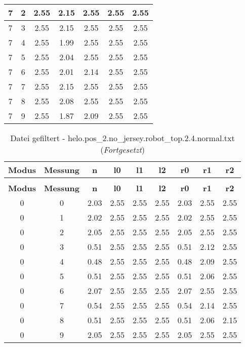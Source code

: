 \begin{longtable}{|c|c||c||c|c||c|c|}
	7 & 2 & 2.55 & 2.15 & 2.55 & 2.55 & 2.55 \\ \hline
	7 & 3 & 2.55 & 2.15 & 2.55 & 2.55 & 2.55 \\ \hline
	7 & 4 & 2.55 & 1.99 & 2.55 & 2.55 & 2.55 \\ \hline
	7 & 5 & 2.55 & 2.04 & 2.55 & 2.55 & 2.55 \\ \hline
	7 & 6 & 2.55 & 2.01 & 2.14 & 2.55 & 2.55 \\ \hline
	7 & 7 & 2.55 & 2.15 & 2.55 & 2.55 & 2.55 \\ \hline
	7 & 8 & 2.55 & 2.08 & 2.55 & 2.55 & 2.55 \\ \hline
	7 & 9 & 2.55 & 1.87 & 2.09 & 2.55 & 2.55 \\ \hline
\end{longtable}
\clearpage{}
\begin{longtable}{|c|c||c||c|c|c||c|c|c|}
	\caption{Datei gefiltert - helo.pos\_2.no\_jersey.robot\_top.2.4.normal.txt} \label{tab:helo.pos-2.no-jersey.robot-top.2.4.normal.txt} \\ \hline
	\textbf{Modus} & \textbf{Messung} & \textbf{n} & \textbf{l0} & \textbf{l1} & \textbf{l2} & \textbf{r0} & \textbf{r1} & \textbf{r2}\\ \hline
	\endfirsthead
	\caption[]{Datei gefiltert - helo.pos\_2.no\_jersey.robot\_top.2.4.normal.txt (\emph{Fortgesetzt})} \\ \hline
	\textbf{Modus} & \textbf{Messung} & \textbf{n} & \textbf{l0} & \textbf{l1} & \textbf{l2} & \textbf{r0} & \textbf{r1} & \textbf{r2}\\ \hline
	\endhead
	0 & 0 & 2.03 & 2.55 & 2.55 & 2.55 & 2.03 & 2.55 & 2.55 \\ \hline
	0 & 1 & 2.02 & 2.55 & 2.55 & 2.55 & 2.02 & 2.55 & 2.55 \\ \hline
	0 & 2 & 2.05 & 2.55 & 2.55 & 2.55 & 2.05 & 2.55 & 2.55 \\ \hline
	0 & 3 & 0.51 & 2.55 & 2.55 & 2.55 & 0.51 & 2.12 & 2.55 \\ \hline
	0 & 4 & 0.48 & 2.55 & 2.55 & 2.55 & 0.48 & 2.09 & 2.55 \\ \hline
	0 & 5 & 0.51 & 2.55 & 2.55 & 2.55 & 0.51 & 2.06 & 2.55 \\ \hline
	0 & 6 & 2.07 & 2.55 & 2.55 & 2.55 & 2.07 & 2.55 & 2.55 \\ \hline
	0 & 7 & 0.54 & 2.55 & 2.55 & 2.55 & 0.54 & 2.14 & 2.55 \\ \hline
	0 & 8 & 0.51 & 2.55 & 2.55 & 2.55 & 0.51 & 2.06 & 2.15 \\ \hline
	0 & 9 & 2.05 & 2.55 & 2.55 & 2.55 & 2.05 & 2.55 & 2.55 \\ \hline

\end{longtable}
